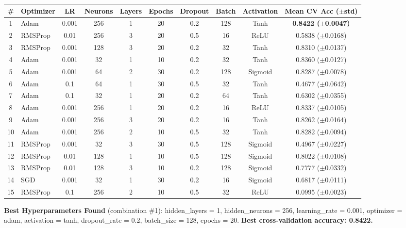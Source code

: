 \documentclass[11pt]{article}
\begin{document}
\begin{center}
{\scriptsize
\begin{tabular}{|c|l|c|c|c|c|c|c|c|c|}
\hline
\textbf{\#} & \textbf{Optimizer} & \textbf{LR} & \textbf{Neurons} & \textbf{Layers} & \textbf{Epochs} & \textbf{Dropout} & \textbf{Batch} & \textbf{Activation} & \textbf{Mean CV Acc ($\pm$std)} \\ \hline
1  & Adam     & 0.001 & 256 & 1 & 20 & 0.2 & 128 & Tanh    & \textbf{0.8422 ($\pm$0.0047)} \\ \hline
2  & RMSProp  & 0.01  & 256 & 3 & 20 & 0.5 & 16  & ReLU    & 0.5838 ($\pm$0.0168) \\ \hline
3  & RMSProp  & 0.001 & 128 & 3 & 20 & 0.2 & 32  & Tanh    & 0.8310 ($\pm$0.0137) \\ \hline
4  & Adam     & 0.001 & 32  & 1 & 10 & 0.2 & 32  & Tanh    & 0.8360 ($\pm$0.0127) \\ \hline
5  & Adam     & 0.001 & 64  & 2 & 30 & 0.2 & 128 & Sigmoid & 0.8287 ($\pm$0.0078) \\ \hline
6  & Adam     & 0.1   & 64  & 1 & 30 & 0.5 & 32  & Tanh    & 0.4677 ($\pm$0.0642) \\ \hline
7  & Adam     & 0.1   & 32  & 1 & 20 & 0.2 & 64  & Tanh    & 0.6302 ($\pm$0.0355) \\ \hline
8  & Adam     & 0.001 & 256 & 1 & 20 & 0.2 & 16  & ReLU    & 0.8337 ($\pm$0.0105) \\ \hline
9  & Adam     & 0.001 & 256 & 3 & 20 & 0.2 & 16  & Tanh    & 0.8262 ($\pm$0.0164) \\ \hline
10 & Adam     & 0.001 & 256 & 2 & 10 & 0.5 & 32  & Tanh    & 0.8282 ($\pm$0.0094) \\ \hline
11 & RMSProp  & 0.001 & 32  & 3 & 30 & 0.5 & 128 & Sigmoid & 0.4967 ($\pm$0.0227) \\ \hline
12 & RMSProp  & 0.01  & 128 & 1 & 10 & 0.5 & 128 & Sigmoid & 0.8022 ($\pm$0.0108) \\ \hline
13 & RMSProp  & 0.01  & 128 & 3 & 10 & 0.2 & 128 & Sigmoid & 0.7777 ($\pm$0.0332) \\ \hline
14 & SGD      & 0.001 & 32  & 1 & 30 & 0.2 & 16  & Sigmoid & 0.6817 ($\pm$0.0111) \\ \hline
15 & RMSProp  & 0.1   & 256 & 2 & 10 & 0.5 & 32  & ReLU    & 0.0995 ($\pm$0.0023) \\ \hline
\end{tabular}
}
\end{center}

\textbf{Best Hyperparameters Found} (combination \#1): hidden\_layers = 1, hidden\_neurons = 256,
learning\_rate = 0.001, optimizer = adam, activation = tanh, dropout\_rate = 0.2, batch\_size =
128, epochs = 20. \textbf{Best cross-validation accuracy: 0.8422.}
\end{document}
